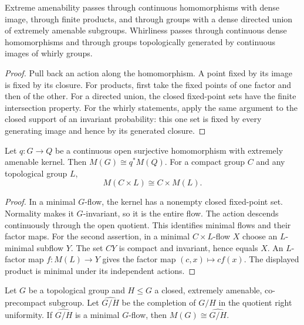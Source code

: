 \begin{lemma}\label{lem:cu-permanence}
 Extreme amenability passes through continuous
homomorphisms with dense image, through finite products, and through groups
with a dense directed union of extremely amenable subgroups. Whirliness
passes through continuous dense homomorphisms and through groups
topologically generated by continuous images of whirly groups.
\end{lemma}

\begin{proof}
Pull back an action along the homomorphism. A point fixed by its image is
fixed by its closure. For products, first take the fixed points of one
factor and then of the other. For a directed union, the closed fixed-point
sets have the finite intersection property. For the whirly statements, apply
the same argument to the closed support of an invariant probability: this
one set is fixed by every generating image and hence by its generated
closure.
\end{proof}

\begin{lemma}\label{lem:cu-kernel}
 Let $q:G\to Q$ be a continuous open surjective
homomorphism with extremely amenable kernel. Then $M(G)\cong q^*M(Q)$. For a
compact group $C$ and any topological group $L$, 
\begin{equation*}
M(C\times L)\cong C\times M(L).
\end{equation*}
\end{lemma}

\begin{proof}
In a minimal $G$-flow, the kernel has a nonempty closed fixed-point set.
Normality makes it $G$-invariant, so it is the entire flow. The action
descends continuously through the open quotient. This identifies minimal
flows and their factor maps. For the second assertion, in a minimal $C\times
L$-flow $X$ choose an $L$-minimal subflow $Y$. The set $CY$ is compact and
invariant, hence equals $X$. An $L$-factor map $f:M(L)\to Y$ gives the
factor map $(c,x)\mapsto cf(x)$. The displayed product is minimal under its
independent actions.
\end{proof}

\begin{lemma}\label{lem:cu-completion-criterion}
 Let $G$ be a topological group and $H\leq G$
a closed, extremely amenable, co-precompact subgroup. Let $\widehat{G/H}$ be
the completion of $G/H$ in the quotient right uniformity. If $\widehat{G/H}$
is a minimal $G$-flow, then $M(G)\cong\widehat{G/H}$.
\end{lemma}

